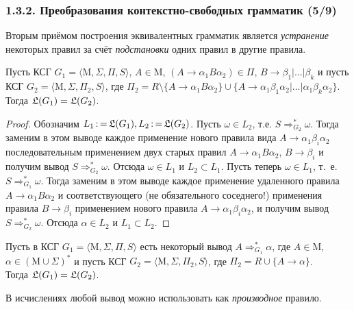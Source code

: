 \documentclass[mathserif,12pt,aspectratio=169]{beamer}
\def\emразделенной{\em разделенной}
\renewcommand{\index}[1]{}
\def\em#1{\it\color{blue}#1}
\def\odmkey#1#2{{\it\color{red} #1}\index{#2}}
\def\Assign{\operatorname{:=}}
\def\Mu{\mathrm{M}}
\begin{document}
\begin{frame}
\frametitle{1.3.2. Преобразования контекстно-свободных грамматик (5/9)}

Вторым приёмом построения эквивалентных грамматик 
является \odmkey{устранение}{Устранение!правила} 
некоторых правил за счёт {\em подстановки} 
одних правил в другие правила.

\smallskip
\begin{theorem}
Пусть КСГ $G_1=\langle \Mu, \Sigma, \Pi, S\rangle$,
$A\in \Mu$, $(A\to \alpha_1 B \alpha_2)\in \Pi$,
$B \to \beta_1 |\dots|\beta_k$ и
пусть КСГ $G_2=\langle \Mu, \Sigma, \Pi_2, S\rangle$,
где $\Pi_2=R\setminus \{A\to \alpha_1 B \alpha_2\}
\cup\{A\to \alpha_1\beta_1\alpha_2|\dots|\alpha_1\beta_k\alpha_2\}$. 
Тогда $\frak{L}(G_1)=\frak{L}(G_2)$.
\end{theorem}

\begin{proof}
Обозначим $L_1\Assign\frak{L}(G_1), L_2\Assign\frak{L}(G_2)$. 
Пусть $\omega\in L_2$, т.е. $S\Rightarrow^*_{G_2} \omega$.
Тогда заменим в этом выводе 
каждое применение нового правила вида
$A\to\alpha_1\beta_i\alpha_2$ последовательным
применением двух старых правил $A\to\alpha_1 B\alpha_2$, 
$B\to\beta_i$ и получим вывод 
$S\Rightarrow^*_{G_2} \omega$.
Отсюда $\omega\in L_1$ и $L_2\subset L_1$.
Пусть теперь $\omega\in L_1$, т.~е. $S\Rightarrow^*_{G_1} \omega$.
Тогда заменим в этом выводе 
каждое применение удаленного правила 
$A\to\alpha_1 B \alpha_2$ и соответствующего
(не обязательного соседнего!) 
применения правила $B\to\beta_i$
применением нового правила $A\to\alpha_1 \beta_i\alpha_2$, 
 и получим вывод 
$S\Rightarrow^*_{G_2} \omega$.
Отсюда $\alpha\in L_2$ и $L_1\subset L_2$.
\end{proof}

\begin{corollary} Пусть в КСГ 
$G_1=\langle \Mu, \Sigma, \Pi , S \rangle$
есть некоторый вывод $A\Rightarrow^*_{G_1}\alpha$,
где $A\in \Mu$, $\alpha\in (\Mu\cup \Sigma)^*$ и
пусть КСГ $G_2=\langle \Mu, \Sigma, \Pi_2, S \rangle$,
где $\Pi_2=R\cup\{A\to \alpha\}$. \\
Тогда $\frak{L}(G_1)=\frak{L}(G_2)$.
\end{corollary}

\begin{remark}
В исчислениях любой вывод можно использовать как 
\odmkey{производное}{Правило!производное} правило.
\end{remark}

\end{frame}
\end{document}
